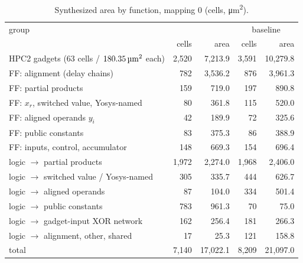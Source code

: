 \begin{table}[h]\centering\small
\caption{Synthesized area by function, mapping 0 (cells, \si{\micro\meter\squared}).}\label{tab:resources-full}
\begin{tabular}{@{}lrrrr@{}}
\toprule
group & \multicolumn{2}{c}{\PAMS{}} & \multicolumn{2}{c}{baseline} \\
 & cells & area & cells & area \\
\midrule
HPC2 gadgets (63 cells / $180.35\,\si{\micro\meter\squared}$ each) & 2,520 & 7,213.9 & 3,591 & 10,279.8 \\
FF: alignment (delay chains) & 782 & 3,536.2 & 876 & 3,961.3 \\
FF: partial products & 159 & 719.0 & 197 & 890.8 \\
FF: $x_r$, switched value, Yosys-named & 80 & 361.8 & 115 & 520.0 \\
FF: aligned operands $y_i$ & 42 & 189.9 & 72 & 325.6 \\
FF: public constants & 83 & 375.3 & 86 & 388.9 \\
FF: inputs, control, accumulator & 148 & 669.3 & 154 & 696.4 \\
logic $\to$ partial products & 1,972 & 2,274.0 & 1,968 & 2,406.0 \\
logic $\to$ switched value / Yosys-named & 305 & 335.7 & 444 & 626.7 \\
logic $\to$ aligned operands & 87 & 104.0 & 334 & 501.4 \\
logic $\to$ public constants & 783 & 961.3 & 70 & 75.0 \\
logic $\to$ gadget-input XOR network & 162 & 256.4 & 181 & 266.3 \\
logic $\to$ alignment, other, shared & 17 & 25.3 & 121 & 158.8 \\
\midrule
total & 7,140 & 17,022.1 & 8,209 & 21,097.0 \\
\bottomrule
\end{tabular}
\end{table}
